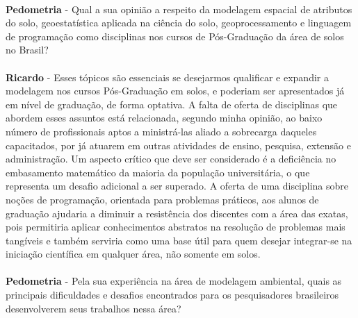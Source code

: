 \\
\textbf{Pedometria} - Qual a sua opinião a respeito da modelagem espacial de atributos do solo, geoestatística aplicada na ciência do solo, geoprocessamento e linguagem de programação como disciplinas nos cursos de Pós-Graduação da área de solos no Brasil?\\
\\
\textbf{Ricardo} - Esses tópicos são essenciais se desejarmos qualificar e expandir a modelagem nos cursos Pós-Graduação em solos, e poderiam ser apresentados já em nível de graduação, de forma optativa. A falta de oferta de disciplinas que abordem esses assuntos está relacionada, segundo minha opinião, ao baixo número de profissionais aptos a ministrá-las aliado a sobrecarga daqueles capacitados, por já atuarem em outras atividades de ensino, pesquisa, extensão e administração. Um aspecto crítico que deve ser considerado é a deficiência no embasamento matemático da maioria da população universitária, o que representa um desafio adicional a ser superado. A oferta de uma disciplina sobre noções de programação, orientada para problemas práticos, aos alunos de graduação ajudaria a diminuir a resistência dos discentes com a área das exatas, pois permitiria aplicar conhecimentos abstratos na resolução de problemas mais tangíveis e também serviria como uma base útil para quem desejar integrar-se na iniciação científica em qualquer área, não somente em solos.\\
\\
\textbf{Pedometria} - Pela sua experiência na área de modelagem ambiental, quais as principais dificuldades e desafios encontrados para os pesquisadores brasileiros desenvolverem seus trabalhos nessa área?\\
\\
